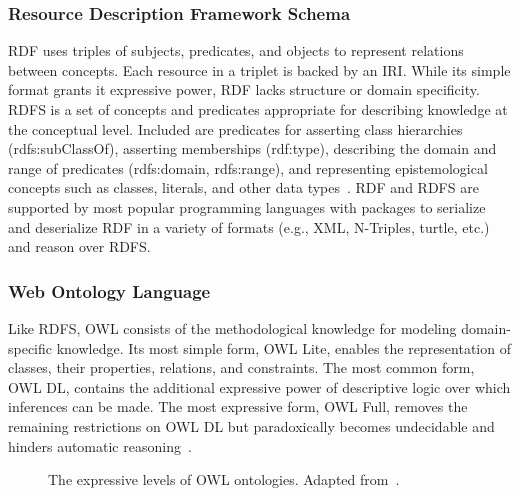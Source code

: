\subsubsection{Resource Description Framework Schema}

\ac{RDF} uses triples of subjects, predicates, and objects to represent relations between concepts.
Each resource in a triplet is backed by an \ac{IRI}.
While its simple format grants it expressive power, \ac{RDF} lacks structure or domain specificity.
\ac{RDFS} is a set of concepts and predicates appropriate for describing knowledge at the conceptual level.
Included are predicates for asserting class hierarchies (rdfs:subClassOf), asserting memberships (rdf:type), describing the domain and range of predicates (rdfs:domain, rdfs:range), and representing epistemological concepts such as classes, literals, and other data types~\cite{Beckett2014}.
RDF and RDFS are supported by most popular programming languages with packages to serialize and deserialize RDF in a variety of formats (e.g., \ac{XML}, N-Triples, turtle, etc.) and reason over \ac{RDFS}.

\subsubsection{Web Ontology Language}

Like \ac{RDFS}, \ac{OWL} consists of the methodological knowledge for modeling domain-specific knowledge.
Its most simple form, \ac{OWL} Lite, enables the representation of classes, their properties, relations, and constraints.
The most common form, \ac{OWL} \ac{DL}, contains the additional expressive power of descriptive logic over which inferences can be made.
The most expressive form, \ac{OWL} Full, removes the remaining restrictions on \ac{OWL} \ac{DL} but paradoxically becomes undecidable and hinders automatic reasoning~\cite{Marchetti2008}.

\begin{figure}
    \captionsetup{format=plain}
    \caption[Descriptive Levels of OWL]{The expressive levels of OWL ontologies. Adapted from~\cite{Marchetti2008}.}
    \label{Fig:owl_types}
\end{figure}

